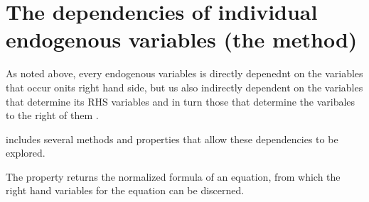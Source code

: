\documentclass[letterpaper,10pt,english]{jupyterBook}
\begin{document}
\chapter{The dependencies of individual endogenous variables (the  method)}
\label{\detokenize{content/06_ModelAnalytics/ModelStructure:the-dependencies-of-individual-endogenous-variables-the-tracepre-method}}
\sphinxAtStartPar
As noted above, every endogenous variables is directly depenednt on the variables that occur onits right hand side, but us also indirectly dependent on the variables that determine its RHS variables and in turn those that determine the varibales to the right of them .

\sphinxAtStartPar
{} includes several methods and properties that allow these dependencies to be explored.

\sphinxAtStartPar
The  property returns the normalized formula of an equation, from which the right hand variables for the equation can be discerned.
\end{document}

